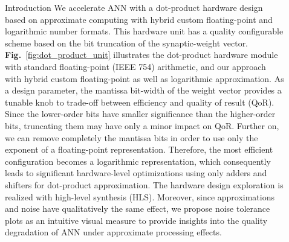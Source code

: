 \documentclass[final]{beamer}
\newlength{\sepwid}
\newlength{\onecolwid}
\newlength{\twocolwid}
\newcommand\fig[1]{\textbf{Fig.}~\ref{#1}}
\begin{document}
\begin{frame}[t]
\begin{columns}[t]
\begin{column}{\onecolwid}
\begin{block}{Introduction}
We accelerate ANN with a dot-product hardware design based on approximate computing with hybrid custom floating-point and logarithmic number formats\cite{nevarez2021accelerating}. This hardware unit has a quality configurable scheme based on the bit truncation of the synaptic-weight vector. \fig{fig:dot_product_unit} illustrates the dot-product hardware module with standard floating-point (IEEE 754) arithmetic, and our approach with hybrid custom floating-point as well as logarithmic approximation. As a design parameter, the mantissa bit-width of the weight vector provides a tunable knob to trade-off between efficiency and quality of result (QoR)\cite{han2013approximate}. Since the lower-order bits have smaller significance than the higher-order bits, truncating them may have only a minor impact on QoR\cite{mittal2016survey}. Further on, we can remove completely the mantissa bits in order to use only the exponent of a floating-point representation. Therefore, the most efficient configuration becomes a logarithmic representation, which consequently leads to significant hardware-level optimizations using only adders and shifters for dot-product approximation. The hardware design exploration is realized with high-level synthesis (HLS). Moreover, since approximations and noise have qualitatively the same effect\cite{venkataramani2015approximate}, we propose noise tolerance plots as an intuitive visual measure to provide insights into the quality degradation of ANN under approximate processing effects.


\end{block}

\end{column} %

\begin{column}{\sepwid}\end{column} %

\begin{column}{\twocolwid} %

\begin{columns}[t,totalwidth=\twocolwid] %

\begin{column}{\onecolwid}\vspace{-.6in} %



\end{column}
\end{columns}
\end{column}
\end{columns}
\end{frame}
\end{document}
